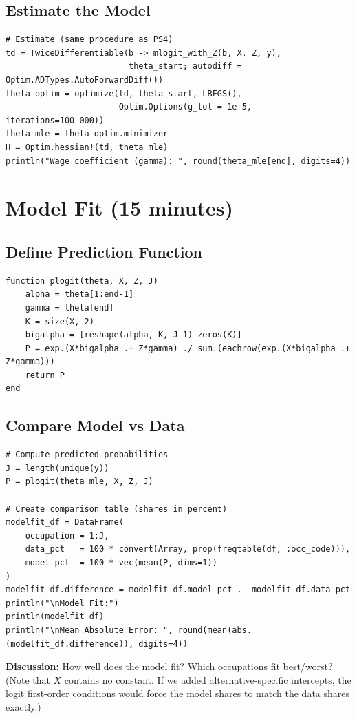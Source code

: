\documentclass[12pt,english]{article}
\begin{document}
\subsection{Estimate the Model}
\begin{verbatim}
# Estimate (same procedure as PS4)
td = TwiceDifferentiable(b -> mlogit_with_Z(b, X, Z, y),
                         theta_start; autodiff = Optim.ADTypes.AutoForwardDiff())
theta_optim = optimize(td, theta_start, LBFGS(),
                       Optim.Options(g_tol = 1e-5, iterations=100_000))
theta_mle = theta_optim.minimizer
H = Optim.hessian!(td, theta_mle)
println("Wage coefficient (gamma): ", round(theta_mle[end], digits=4))
\end{verbatim}
\section{Model Fit (15 minutes)}
\subsection{Define Prediction Function}
\begin{verbatim}
function plogit(theta, X, Z, J)
    alpha = theta[1:end-1]
    gamma = theta[end]
    K = size(X, 2)
    bigalpha = [reshape(alpha, K, J-1) zeros(K)]
    P = exp.(X*bigalpha .+ Z*gamma) ./ sum.(eachrow(exp.(X*bigalpha .+ Z*gamma)))
    return P
end
\end{verbatim}
\subsection{Compare Model vs Data}
\begin{verbatim}
# Compute predicted probabilities
J = length(unique(y))
P = plogit(theta_mle, X, Z, J)

# Create comparison table (shares in percent)
modelfit_df = DataFrame(
    occupation = 1:J,
    data_pct   = 100 * convert(Array, prop(freqtable(df, :occ_code))),
    model_pct  = 100 * vec(mean(P, dims=1))
)
modelfit_df.difference = modelfit_df.model_pct .- modelfit_df.data_pct
println("\nModel Fit:")
println(modelfit_df)
println("\nMean Absolute Error: ", round(mean(abs.(modelfit_df.difference)), digits=4))
\end{verbatim}
\textbf{Discussion:} How well does the model fit? Which occupations fit best/worst? (Note that $X$ contains no constant. If we added alternative-specific intercepts, the logit first-order conditions would force the model shares to match the data shares exactly.)
\end{document}
